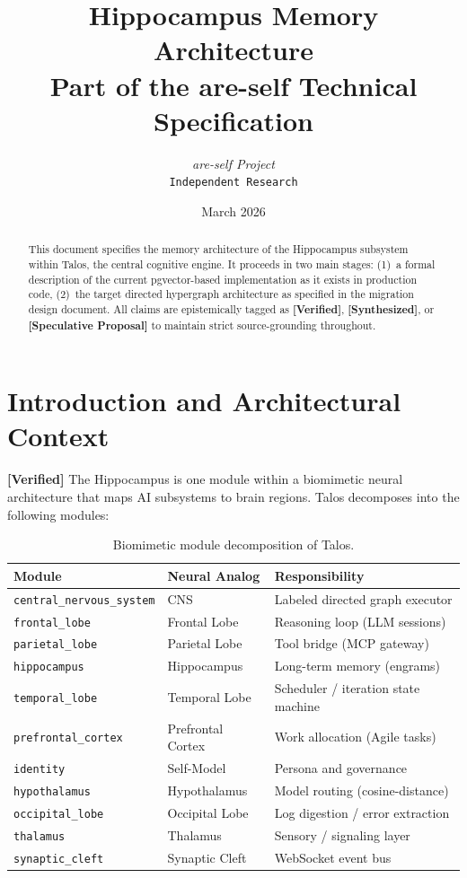 \documentclass[11pt]{article}
\title{%
  \textbf{Hippocampus Memory Architecture} \\[0.3em]
  \normalsize Part of the are-self Technical Specification
}
\author{
  \textit{are-self Project} \\
  \texttt{Independent Research}
}
\date{March 2026}
\newcommand{\verified}{\textcolor{verifiedgreen}{\textbf{[Verified]}}}
\newcommand{\synthesized}{\textcolor{synthesizedblue}{\textbf{[Synthesized]}}}
\newcommand{\speculative}{\textcolor{speculativeorange}{\textbf{[Speculative Proposal]}}}
\theoremstyle{definition}
\theoremstyle{remark}
\begin{document}
\maketitle

\begin{abstract}
This document specifies the memory architecture of the Hippocampus subsystem
within Talos, the central cognitive engine.
It proceeds in two main stages: (1)~a formal description of the current
pgvector-based implementation as it exists in production code, (2)~the target
directed hypergraph architecture as specified in the migration design document. 
All claims are epistemically tagged as \verified{}, \synthesized{}, or \speculative{} to maintain strict
source-grounding throughout.
\end{abstract}

\tableofcontents
\newpage

\section{Introduction and Architectural Context}

\verified{} The Hippocampus is one module within a biomimetic neural
architecture that maps AI subsystems to brain regions. Talos decomposes into the following modules:

\begin{table}[h]
\centering
\begin{tabular}{@{}lll@{}}
\toprule
\textbf{Module} & \textbf{Neural Analog} & \textbf{Responsibility} \\
\midrule
\texttt{central\_nervous\_system} & CNS & Labeled directed graph executor \\
\texttt{frontal\_lobe} & Frontal Lobe & Reasoning loop (LLM sessions) \\
\texttt{parietal\_lobe} & Parietal Lobe & Tool bridge (MCP gateway) \\
\texttt{hippocampus} & Hippocampus & Long-term memory (engrams) \\
\texttt{temporal\_lobe} & Temporal Lobe & Scheduler / iteration state machine \\
\texttt{prefrontal\_cortex} & Prefrontal Cortex & Work allocation (Agile tasks) \\
\texttt{identity} & Self-Model & Persona and governance \\
\texttt{hypothalamus} & Hypothalamus & Model routing (cosine-distance) \\
\texttt{occipital\_lobe} & Occipital Lobe & Log digestion / error extraction \\
\texttt{thalamus} & Thalamus & Sensory / signaling layer \\
\texttt{synaptic\_cleft} & Synaptic Cleft & WebSocket event bus \\
\bottomrule
\end{tabular}
\caption{Biomimetic module decomposition of Talos.}
\label{tab:modules}
\end{table}
\end{document}
